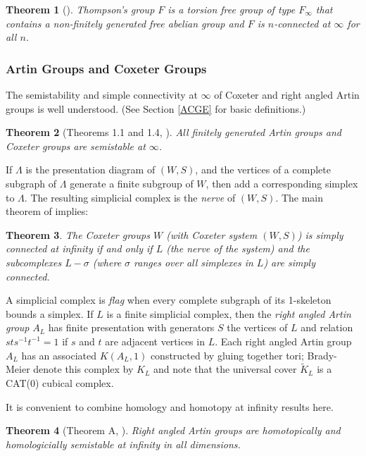 \documentclass[12pt]{article}
\newtheorem{theorem}{Theorem}[subsection]
\begin{document}
\begin{theorem} [\cite{BG84}] \label{ThompNC}
Thompson's group $F$ is a torsion free group of type $F_\infty$ that contains a non-finitely generated free abelian group and $F$ is $n$-connected at $\infty$ for all $n$. 
\end{theorem}

\subsubsection{Artin Groups and Coxeter Groups}\label{AGCG}
The semistability and simple connectivity at $\infty$ of Coxeter and right angled Artin groups is well understood. (See Section \ref{ACGE} for basic definitions.)

\begin{theorem} [Theorems 1.1 and 1.4, \cite{M96}] \label{ACSS} 
All finitely generated Artin groups and Coxeter groups are semistable at $\infty$.
\end{theorem}

If $\Lambda$ is the presentation diagram of $(W,S)$, and the vertices of a complete subgraph of $\Lambda$ generate a finite subgroup of $W$, then add a corresponding simplex to $\Lambda$. The resulting simplicial complex is the  {\it nerve} of $(W,S)$. 
The main theorem of \cite{DM02} implies:

\begin{theorem} \label{CoxSC}
The Coxeter groups $W$ (with Coxeter system $(W,S)$) is simply connected at infinity if and only if $L$ (the nerve of the system)  and the subcomplexes $L-\sigma$ (where $\sigma$ ranges over all simplexes in $L$) are simply connected.
\end{theorem}


A simplicial complex is {\it flag} when every complete subgraph of its 1-skeleton bounds a simplex. If $L$ is a finite simplicial complex, then the {\it right angled Artin group} $A_L$ has finite presentation with generators $S$ the vertices of $L$ and relation $sts^{-1}t^{-1}=1$ if $s$ and $t$ are adjacent vertices in $L$. Each right angled Artin group $A_L$ has an associated $K(A_L, 1)$ constructed by gluing together tori; Brady-Meier \cite{BrM01} denote this complex by $K_L$ and note that the universal cover $\tilde K_L$ is a CAT(0) cubical complex. 

It is convenient to combine homology and homotopy at infinity results here.

\begin{theorem} [Theorem A, \cite{BrM01}] 
Right angled Artin groups are homotopically and homologicially semistable at infinity in all dimensions. 
\end{theorem}
\end{document}
